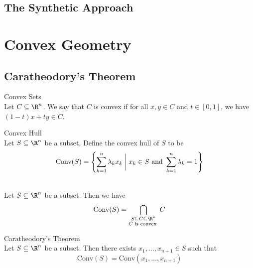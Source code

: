 \documentclass[a4paper]{article}
\begin{document}
\subsection{The Synthetic Approach}

\pagebreak
\section{Convex Geometry}
\subsection{Caratheodory's Theorem}
\begin{defn}{Convex Sets}{}\\
Let $C\subseteq\R^n$. We say that $C$ is convex if for all $x,y\in C$ and $t\in[0,1]$, we have $(1-t)x+ty\in C$. 
\end{defn}

\begin{defn}{Convex Hull}{}\\
Let $S\subseteq\R^n$ be a subset. Define the convex hull of $S$ to be $$\text{Conv}(S)=\left\{\sum_{k=1}^n\lambda_kx_k\;\bigg{|}\;x_k\in S\text{ and }\sum_{k=1}^n\lambda_k=1\right\}$$
\end{defn}

\begin{prp}{}{}\\
Let $S\subseteq\R^n$ be a subset. Then we have $$\text{Conv}(S)=\bigcap_{\substack{S\subseteq C\subseteq\R^n\\C\text{ is convex }}}C$$
\end{prp}

\begin{thm}{Caratheodory's Theorem}{}\\
Let $S\subseteq\R^n$ be a subset. Then there exists $x_1,\dots,x_{n+1}\in S$ such that $$\text{Conv}(S)=\text{Conv}(x_1,\dots,x_{n+1})$$
\end{thm}
\end{document}
